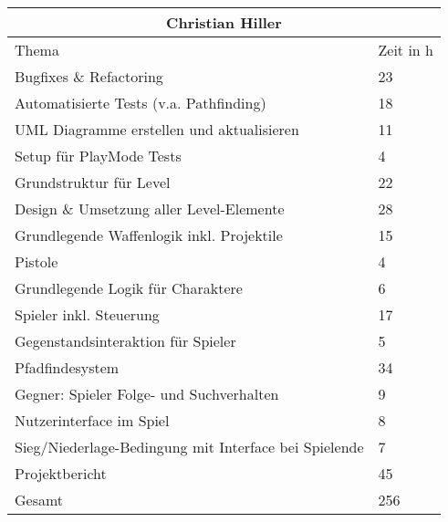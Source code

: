 \begin{tabular}{|l|l|}
	\hline
	\multicolumn{2}{|c|}{Christian Hiller} \\
	\hline
	Thema & Zeit in h \\
	\hline
	Bugfixes \& Refactoring & 23 \\
	\hline
	Automatisierte Tests (v.a. Pathfinding) & 18 \\
	\hline
	UML Diagramme erstellen und aktualisieren & 11 \\
	\hline
	Setup für PlayMode Tests & 4 \\
	\hline
	Grundstruktur für Level & 22 \\
	\hline
	Design \& Umsetzung aller Level-Elemente & 28 \\
	\hline
	Grundlegende Waffenlogik inkl. Projektile & 15 \\
	\hline
	Pistole & 4 \\
	\hline
	Grundlegende Logik für Charaktere & 6 \\
	\hline
	Spieler inkl. Steuerung & 17 \\
	\hline
	Gegenstandsinteraktion für Spieler & 5 \\
	\hline
	Pfadfindesystem & 34 \\
	\hline
	Gegner: Spieler Folge- und Suchverhalten & 9 \\
	\hline
	Nutzerinterface im Spiel & 8 \\
	\hline
	Sieg/Niederlage-Bedingung mit Interface bei Spielende & 7 \\
	\hline
	Projektbericht & 45 \\
	\hline
	Gesamt & 256 \\
	\hline
\end{tabular}

\pagebreak

